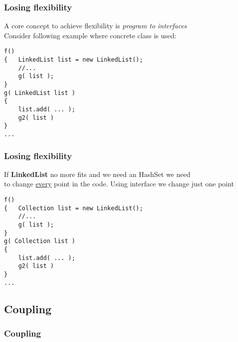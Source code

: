 \documentclass{beamer}
\begin{document}
\begin{frame}[containsverbatim]
	\frametitle{Losing flexibility}
	A core concept to achieve flexibility is \textit{program to interfaces} \\
	Consider following example where concrete class is used:
	\begin{lstlisting}
f()
{   LinkedList list = new LinkedList();
    //...
    g( list );
}
g( LinkedList list )
{
    list.add( ... );
    g2( list )
}
...
\end{lstlisting}
\end{frame}

\begin{frame}[containsverbatim]
	\frametitle{Losing flexibility}
	If \textbf{LinkedList} no more fits and we need an HashSet we need   \\
	to change \underline{every} point in the code. Using interface we change just one point \\
	\begin{lstlisting}
f()
{   Collection list = new LinkedList();
    //...
    g( list );
}
g( Collection list )
{
    list.add( ... );
    g2( list )
}
...
\end{lstlisting}
\end{frame}

\subsection{Coupling}
\begin{frame}
  \frametitle{Coupling}
\end{frame}
\end{document}
